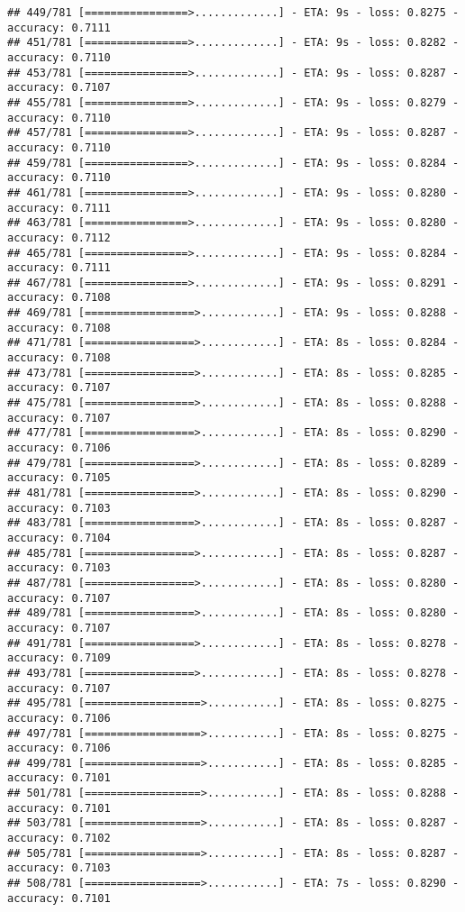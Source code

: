 \documentclass[
]{article}
\begin{document}
\begin{verbatim}
## 449/781 [================>.............] - ETA: 9s - loss: 0.8275 - accuracy: 0.7111
## 451/781 [================>.............] - ETA: 9s - loss: 0.8282 - accuracy: 0.7110
## 453/781 [================>.............] - ETA: 9s - loss: 0.8287 - accuracy: 0.7107
## 455/781 [================>.............] - ETA: 9s - loss: 0.8279 - accuracy: 0.7110
## 457/781 [================>.............] - ETA: 9s - loss: 0.8287 - accuracy: 0.7110
## 459/781 [================>.............] - ETA: 9s - loss: 0.8284 - accuracy: 0.7110
## 461/781 [================>.............] - ETA: 9s - loss: 0.8280 - accuracy: 0.7111
## 463/781 [================>.............] - ETA: 9s - loss: 0.8280 - accuracy: 0.7112
## 465/781 [================>.............] - ETA: 9s - loss: 0.8284 - accuracy: 0.7111
## 467/781 [================>.............] - ETA: 9s - loss: 0.8291 - accuracy: 0.7108
## 469/781 [=================>............] - ETA: 9s - loss: 0.8288 - accuracy: 0.7108
## 471/781 [=================>............] - ETA: 8s - loss: 0.8284 - accuracy: 0.7108
## 473/781 [=================>............] - ETA: 8s - loss: 0.8285 - accuracy: 0.7107
## 475/781 [=================>............] - ETA: 8s - loss: 0.8288 - accuracy: 0.7107
## 477/781 [=================>............] - ETA: 8s - loss: 0.8290 - accuracy: 0.7106
## 479/781 [=================>............] - ETA: 8s - loss: 0.8289 - accuracy: 0.7105
## 481/781 [=================>............] - ETA: 8s - loss: 0.8290 - accuracy: 0.7103
## 483/781 [=================>............] - ETA: 8s - loss: 0.8287 - accuracy: 0.7104
## 485/781 [=================>............] - ETA: 8s - loss: 0.8287 - accuracy: 0.7103
## 487/781 [=================>............] - ETA: 8s - loss: 0.8280 - accuracy: 0.7107
## 489/781 [=================>............] - ETA: 8s - loss: 0.8280 - accuracy: 0.7107
## 491/781 [=================>............] - ETA: 8s - loss: 0.8278 - accuracy: 0.7109
## 493/781 [=================>............] - ETA: 8s - loss: 0.8278 - accuracy: 0.7107
## 495/781 [==================>...........] - ETA: 8s - loss: 0.8275 - accuracy: 0.7106
## 497/781 [==================>...........] - ETA: 8s - loss: 0.8275 - accuracy: 0.7106
## 499/781 [==================>...........] - ETA: 8s - loss: 0.8285 - accuracy: 0.7101
## 501/781 [==================>...........] - ETA: 8s - loss: 0.8288 - accuracy: 0.7101
## 503/781 [==================>...........] - ETA: 8s - loss: 0.8287 - accuracy: 0.7102
## 505/781 [==================>...........] - ETA: 8s - loss: 0.8287 - accuracy: 0.7103
## 508/781 [==================>...........] - ETA: 7s - loss: 0.8290 - accuracy: 0.7101

\end{verbatim}
\end{document}
